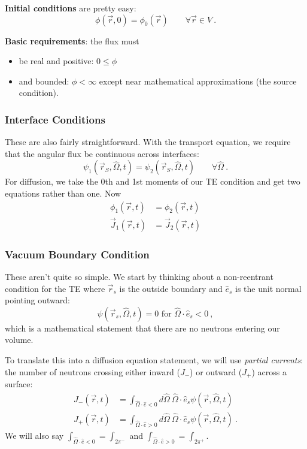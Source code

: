 \documentclass[12pt]{article}
\newcommand{\vOmega}{\ensuremath{\hat{\Omega}}}
\begin{document}
\textbf{Initial conditions} are pretty easy:
\[\phi(\vec{r}, 0) = \phi_0(\vec{r}) \qquad \forall \vec{r} \in V \:.\]

\textbf{Basic requirements}: the flux must
\begin{itemize}
\item be real and positive: $0 \leq \phi$
\item and bounded: $\phi < \infty$ except near mathematical approximations (the source condition). 
\end{itemize}

\subsubsection*{Interface Conditions}
These are also fairly straightforward. With the transport equation, we require that the angular flux be continuous across interfaces: 
\[\psi_1(\vec{r}_S, \vOmega, t) = \psi_2(\vec{r}_S,\vOmega, t)\qquad \forall \vOmega\:.\]
For diffusion, we take the 0th and 1st moments of our TE condition and get two equations rather than one. Now
\begin{align*}
\phi_1(\vec{r}, t) &= \phi_2(\vec{r}, t) \\
\vec{J}_1(\vec{r}, t) &= \vec{J}_2(\vec{r}, t)
\end{align*}

\subsubsection*{Vacuum Boundary Condition}
These aren't quite so simple. We start by thinking about a non-reentrant condition for the TE where $\vec{r}_s$ is the outside boundary and $\hat{e}_s$ is the unit normal pointing outward: 
\[\psi(\vec{r}_s, \vOmega, t) = 0 \text{ for } \vOmega \cdot \hat{e}_s < 0 \:,\]
%
which is a mathematical statement that there are no neutrons entering our volume. 

To translate this into a diffusion equation statement, we will use \textit{partial currents}: the number of neutrons crossing either inward ($J_{-}$) or outward ($J_{+}$) across a surface:
\begin{align*}
J_{-}(\vec{r},t) &= \int_{\vOmega \cdot \hat{e} < 0} d\vOmega \: \vOmega \cdot \hat{e}_s \psi(\vec{r}, \vOmega, t) \\
J_{+}(\vec{r},t) &= \int_{\vOmega \cdot \hat{e} > 0} d\vOmega \: \vOmega \cdot \hat{e}_s \psi(\vec{r}, \vOmega, t)\:.
\end{align*}
We will also say $\int_{\vOmega \cdot \hat{e} < 0} = \int_{2\pi^{-}}$ and  $\int_{\vOmega \cdot \hat{e} > 0} = \int_{2\pi^{+}}$. 
\end{document}

